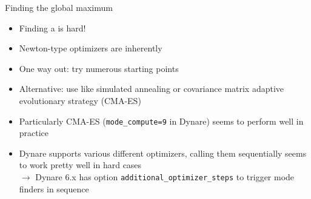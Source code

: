 \documentclass[handout,usepdftitle=false,xcolor=dvipsnames,aspectratio=169]{beamer}
\begin{document}
\begin{frame}{Finding the global maximum}
  \begin{itemize}
    \item Finding a  is hard! \vspace{0.2cm}
    \item Newton-type optimizers are inherently \vspace{0.2cm}
    \item One way out: try numerous starting points\vspace{0.2cm}
    \item Alternative: use  like simulated annealing \parencite[e.g.][]{Goffeetal1994,Coronaetal1987} or covariance matrix adaptive evolutionary strategy (CMA-ES) \parencite{Hansenetal2003}\vspace{0.2cm}
    \item Particularly CMA-ES (\texttt{mode\_compute=9} in Dynare) seems to perform well in practice \parencite{Andreasen2010}\vspace{0.2cm}
    \item Dynare supports various different optimizers, calling them sequentially seems to work pretty well in hard cases\\
          $\rightarrow$ Dynare 6.x has option \texttt{additional\_optimizer\_steps} to trigger mode finders in sequence
  \end{itemize}
\end{frame}
\end{document}
